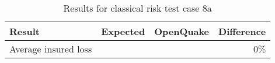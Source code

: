 \begin{table}[htbp]

\centering
\begin{tabular}{ l r r r }

\hline
\rowcolor{anti-flashwhite}
\bf{Result} & \bf{Expected} & \bf{OpenQuake} & \bf{Difference}\\
\hline
Average insured loss &  &  & 0\% \\
\hline
\end{tabular}

\caption{Results for classical risk test case 8a}
\label{tab:result-classical-risk-8a}
\end{table}